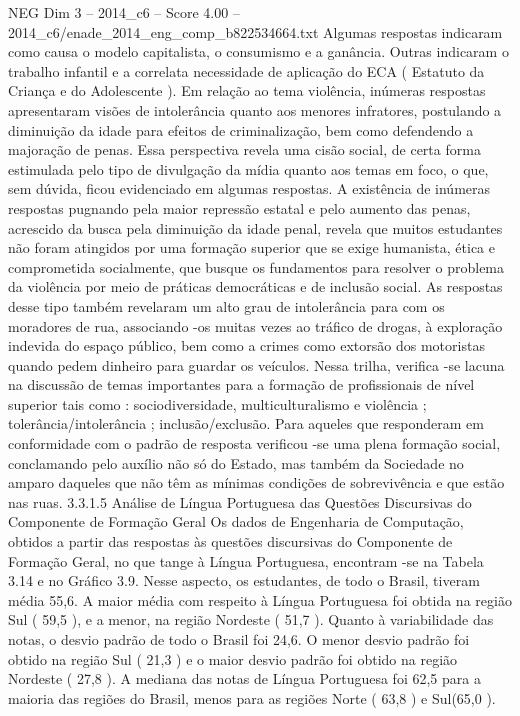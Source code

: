 \begin{textsample}{NEG Dim 3 – 2014\_c6 – Score 4.00 – 2014\_c6/enade\_2014\_eng\_comp\_b822534664.txt}
Algumas respostas indicaram como causa o modelo capitalista, o consumismo e a ganância.
Outras indicaram o trabalho infantil e a correlata necessidade de aplicação do ECA ( Estatuto da Criança e do Adolescente ).
Em relação ao tema violência, inúmeras respostas apresentaram visões de intolerância quanto aos menores infratores, postulando a diminuição da idade para efeitos de criminalização, bem como defendendo a majoração de penas.
Essa perspectiva revela uma cisão social, de certa forma estimulada pelo tipo de divulgação da mídia quanto aos temas em foco, o que, sem dúvida, ficou evidenciado em algumas respostas.
A existência de inúmeras respostas pugnando pela maior repressão estatal e pelo aumento das penas, acrescido da busca pela diminuição da idade penal, revela que muitos estudantes não foram atingidos por uma formação superior que se exige humanista, ética e comprometida socialmente, que busque os fundamentos para resolver o problema da violência por meio de práticas democráticas e de inclusão social.
As respostas desse tipo também revelaram um alto grau de intolerância para com os moradores de rua, associando -os muitas vezes ao tráfico de drogas, à exploração indevida do espaço público, bem como a crimes como extorsão dos motoristas quando pedem dinheiro para guardar os veículos.
Nessa trilha, verifica -se lacuna na discussão de temas importantes para a formação de profissionais de nível superior tais como : sociodiversidade, multiculturalismo e violência ; tolerância/intolerância ; inclusão/exclusão.
Para aqueles que responderam em conformidade com o padrão de resposta verificou -se uma plena formação social, conclamando pelo auxílio não só do Estado, mas também da Sociedade no amparo daqueles que não têm as mínimas condições de sobrevivência e que estão nas ruas. 3.3.1.5 Análise de Língua Portuguesa das Questões Discursivas do Componente de Formação Geral Os dados de Engenharia de Computação, obtidos a partir das respostas às questões discursivas do Componente de Formação Geral, no que tange à Língua Portuguesa, encontram -se na Tabela 3.14 e no Gráfico 3.9.
Nesse aspecto, os estudantes, de todo o Brasil, tiveram média 55,6.
A maior média com respeito à Língua Portuguesa foi obtida na região Sul ( 59,5 ), e a menor, na região Nordeste ( 51,7 ).
Quanto à variabilidade das notas, o desvio padrão de todo o Brasil foi 24,6.
O menor desvio padrão foi obtido na região Sul ( 21,3 ) e o maior desvio padrão foi obtido na região Nordeste ( 27,8 ).
A mediana das notas de Língua Portuguesa foi 62,5 para a maioria das regiões do Brasil, menos para as regiões Norte ( 63,8 ) e Sul(65,0 ).

\end{textsample}
